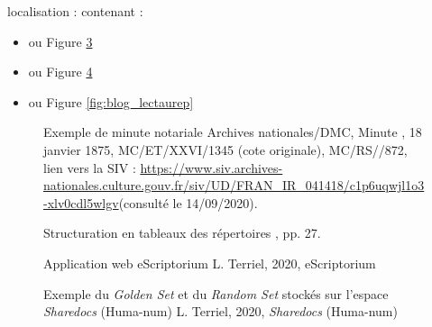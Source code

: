 localisation :  contenant :
\begin{itemize}
    \item {} ou Figure \ref{fig:appli_eScriptorium}
    \item {} ou Figure \ref{fig:shareDocs}
    \item {} ou Figure \ref{fig:blog_lectaurep}
\end{itemize}

\newpage


\begin{figure}[h!]
    \centering
    \centerline{}
    \caption{Exemple de minute notariale \textcopyright Archives nationales/DMC, Minute , 18 janvier 1875,  MC/ET/XXVI/1345 (cote originale), MC/RS//872, lien vers la SIV : \url{https://www.siv.archives-nationales.culture.gouv.fr/siv/UD/FRAN_IR_041418/c1p6uqwjl1o3-xlv0cdl5wlgv}(consulté le 14/09/2020).}
    \label{fig:exemple_minute}
\end{figure}

\begin{figure}[h!]
    \centering
    \centerline{}
    \caption{Structuration en tableaux des répertoires \textcopyright \cite{bonhomme_defis_2018}, pp. 27.} 
    \label{fig:tableaux_repertoires}
\end{figure}

\begin{figure}[h]
    \centering
    \centerline{}
    \caption{Application web eScriptorium \textcopyright L. Terriel, 2020, eScriptorium} 
    \label{fig:appli_eScriptorium}
\end{figure}

\begin{figure}[h]
    \centering
    \centerline{}
    \caption{Exemple du \textit{Golden Set} et du \textit{Random Set} stockés sur l'espace \textit{Sharedocs} (Huma-num) \textcopyright L. Terriel, 2020, \textit{Sharedocs} (Huma-num)} 
    \label{fig:shareDocs}
\end{figure}


